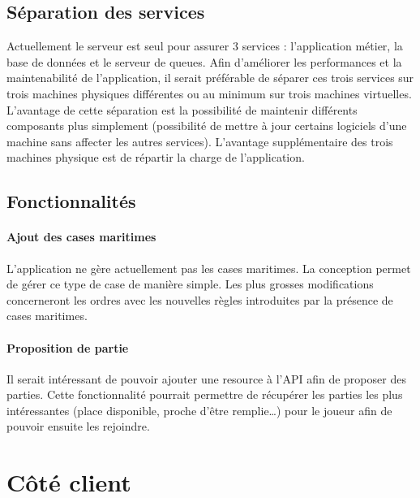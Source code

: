 

	\subsection{Séparation des services} %
	\label{sub:separation_des_services}

		Actuellement le serveur est seul pour assurer 3 services : l'application métier, la base de données et le serveur de queues. Afin d'améliorer les performances et la maintenabilité de l'application, il serait préférable de séparer ces trois services sur trois machines physiques différentes ou au minimum sur trois machines virtuelles. L'avantage de cette séparation est la possibilité de maintenir différents composants plus simplement (possibilité de mettre à jour certains logiciels d'une machine sans affecter les autres services). L'avantage supplémentaire des trois machines physique est de répartir la charge de l'application.


	\subsection{Fonctionnalités} %
	\label{sub:fonctionnalites}
	
		\paragraph{Ajout des cases maritimes} %
		\label{par:ajout_des_cases_maritimes}
			L'application ne gère actuellement pas les cases maritimes. La conception permet de gérer ce type de case de manière simple. Les plus grosses modifications concerneront les ordres avec les nouvelles règles introduites par la présence de cases maritimes.

		\paragraph{Proposition de partie} %
		\label{par:proposition_de_partie}
			Il serait intéressant de pouvoir ajouter une resource à l'API afin de proposer des parties. Cette fonctionnalité pourrait permettre de récupérer les parties les plus intéressantes (place disponible, proche d'être remplie\dots) pour le joueur afin de pouvoir ensuite les rejoindre.


\section{Côté client}
